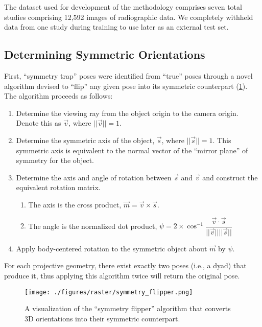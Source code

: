 The dataset used for development of the methodology comprises seven total studies \cite{jennyREGISTRATIONKNEEKINEMATICS2015,kefalaAssessmentKneeKinematics2017,okamotoVivoKneeKinematics2011,palm-vlasakMinimalVariationTop2022,scottCanTotalKnee2016,watanabeKneeKinematicsAnterior2013,watanabeInvivoKinematicsHighflex2016} comprising 12,592 images of radiographic data.
We completely withheld data from one study \cite{okamotoVivoKneeKinematics2011} during training to use later as an external test set.

\subsection{Determining Symmetric Orientations}
First, ``symmetry trap'' poses were identified from ``true'' poses through a novel algorithm devised to “flip” any given pose into its symmetric counterpart (\cref{fig:sym-flipper-alg}). The algorithm proceeds as follows:

\begin{enumerate}
	\item Determine the viewing ray from the object origin to the camera origin. Denote this as $\vec{v}$, where $||\vec{v}|| = 1$.
	\item Determine the symmetric axis of the object, $\vec{s}$, where $||\vec{s}|| = 1$. This symmetric axis is equivalent to the normal vector of the ``mirror plane'' of symmetry for the object.
	\item Determine the axis and angle of rotation between $\vec{s}$ and $\vec{v}$ and construct the equivalent rotation matrix.
	      \begin{enumerate}
		      \item The axis is the cross product, $\vec{m} = \vec{v} \times \vec{s}$.
		      \item The angle is the normalized dot product, $\psi = 2 \times \cos^{-1}\dfrac{\vec{v} \cdot \vec{s}}{||\vec{v}||||\vec{s}||}$
	      \end{enumerate}
	\item Apply body-centered rotation to the symmetric object about $\vec{m}$ by $\psi$.
\end{enumerate}

For each projective geometry, there exist exactly two poses (i.e., a dyad) that produce it, thus applying this algorithm twice will return the original pose.

\begin{figure}[h!]
	\centering
	\texttt{[image: ./figures/raster/symmetry\_flipper.png]}
	\caption{A visualization of the ``symmetry flipper'' algorithm that converts 3D orientations into their symmetric counterpart.}
	\label{fig:sym-flipper-alg}
\end{figure}

